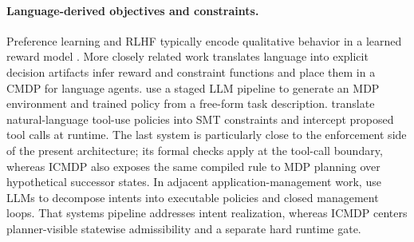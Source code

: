 \documentclass[journal]{IEEEtran}
\theoremstyle{definition}
\begin{document}
\paragraph{Language-derived objectives and constraints.}
Preference learning and RLHF typically encode qualitative behavior in a
learned reward model \cite{christiano2017,leike2018}. More closely related
work translates language into explicit decision artifacts infer reward and constraint functions and place
them in a CMDP for language agents. \cite{jegal2025alamp} use a staged LLM
pipeline to generate an MDP environment and trained policy from a free-form
task description. \cite{winston2026solver} translate natural-language
tool-use policies into SMT constraints and intercept proposed tool calls at
runtime. The last system is particularly close to the enforcement side of the
present architecture; its formal checks apply at the tool-call boundary,
whereas ICMDP also exposes the same compiled rule to MDP planning over
hypothetical successor states. In adjacent application-management work,
\cite{dzeparoska2024policy} use LLMs to decompose intents into executable
policies and closed management loops. That systems pipeline addresses intent
realization, whereas ICMDP centers planner-visible statewise admissibility and
a separate hard runtime gate.
\end{document}
